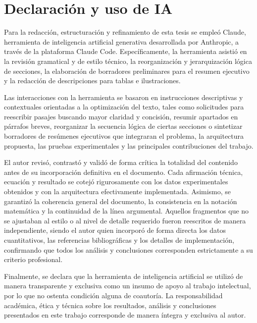 \chapter*{Declaración y uso de IA}

Para la redacción, estructuración y refinamiento de esta tesis se empleó Claude, herramienta de inteligencia artificial generativa desarrollada por Anthropic, a través de la plataforma Claude Code. Específicamente, la herramienta asistió en la revisión gramatical y de estilo técnico, la reorganización y jerarquización lógica de secciones, la elaboración de borradores preliminares para el resumen ejecutivo y la redacción de descripciones para tablas e ilustraciones.


Las interacciones con la herramienta se basaron en instrucciones descriptivas y contextuales orientadas a la optimización del texto, tales como solicitudes para reescribir pasajes buscando mayor claridad y concisión, resumir apartados en párrafos breves, reorganizar la secuencia lógica de ciertas secciones o sintetizar borradores de resúmenes ejecutivos que integraran el problema, la arquitectura propuesta, las pruebas experimentales y las principales contribuciones del trabajo.


El autor revisó, contrastó y validó de forma crítica la totalidad del contenido antes de su incorporación definitiva en el documento. Cada afirmación técnica, ecuación y resultado se cotejó rigurosamente con los datos experimentales obtenidos y con la arquitectura efectivamente implementada. Asimismo, se garantizó la coherencia general del documento, la consistencia en la notación matemática y la continuidad de la línea argumental. Aquellos fragmentos que no se ajustaban al estilo o al nivel de detalle requerido fueron reescritos de manera independiente, siendo el autor quien incorporó de forma directa los datos cuantitativos, las referencias bibliográficas y los detalles de implementación, confirmando que todos los análisis y conclusiones corresponden estrictamente a su criterio profesional.


Finalmente, se declara que la herramienta de inteligencia artificial se utilizó de manera transparente y exclusiva como un insumo de apoyo al trabajo intelectual, por lo que no ostenta condición alguna de coautoría. La responsabilidad académica, ética y técnica sobre los resultados, análisis y conclusiones presentados en este trabajo corresponde de manera íntegra y exclusiva al autor.